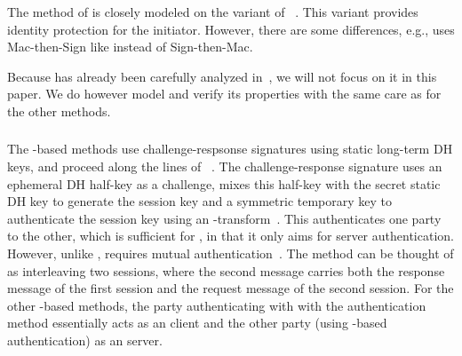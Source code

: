 \subsubsection{\mSigma{}}
\label{sec:sigma}
The \mSigSig{} method of \mEdhoc{} is closely modeled on the \mSigmaI{} variant of \mSigma{}~\cite{sigma}. This variant provides identity protection for the initiator. However, there are some differences, e.g., \mSigSig{} uses Mac-then-Sign like \mTls{} instead of Sign-then-Mac.

Because \mSigSig{} has already been carefully analyzed in~\cite{DBLP:conf/secsr/BruniJPS18}, we will not focus 
on it in this paper. We do however model \mSigSig{} and verify its properties with the same care as for the other methods.
%

\subsubsection{\mOptls{}}
\label{sec:optls}
The \mStat-based methods use challenge-respsonse signatures using static
long-term DH keys, and proceed along the lines of
\mOptls~\cite{DBLP:conf/eurosp/KrawczykW16}.
%
The challenge-response signature uses an ephemeral DH half-key as a challenge, mixes this half-key with the secret static DH key to generate the session key and a symmetric temporary key to authenticate the session key using an \mAead{}-transform~\cite{DBLP:conf/eurosp/KrawczykW16,aead}.
%
This authenticates one party to the other, which is sufficient for \mOptls, in that it only aims for server authentication.
%
%
However, unlike \mOptls{}, \mEdhoc{} requires mutual authentication~\cite{ietf-lake-reqs-04}. The \mStatStat{} method can be thought of as interleaving two \mOptls{} sessions, where the second \mEdhoc{} message carries both the response message of the first \mOptls{} session and the request message of the second \mOptls{} session. For the other \mStat{}-based methods, the party authenticating with with the \mStat{} authentication method essentially acts as an \mOptls{} client and the other party (using \mSig{}-based authentication) as an \mOptls{} server. 

